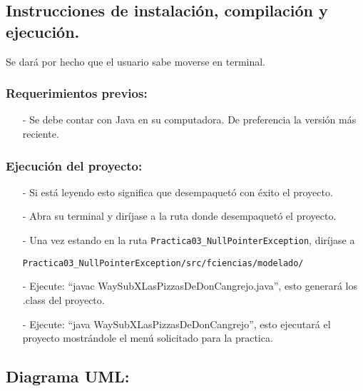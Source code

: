 \documentclass{article}
\newcommand{\code}[1]{\textcolor{white!25!black}{\texttt{#1}}}
\begin{document}
\subsection*{Instrucciones de instalación, compilación y ejecución.}
Se dará por hecho que el usuario sabe moverse en terminal.\\

\subsubsection*{Requerimientos previos:}
\begin{itemize}
\item[-] Se debe contar con Java en su computadora. De preferencia la versión más reciente.
\end{itemize}

\subsubsection*{Ejecución del proyecto:}
\begin{itemize}
\item[-] Si está leyendo esto significa que desempaquetó con éxito el proyecto.
\item[-] Abra su terminal y diríjase a la ruta donde desempaquetó el proyecto.
\item[-] Una vez estando en la ruta \code{Practica03\_NullPointerException}, diríjase a

  \code{Practica03\_NullPointerException/src/fciencias/modelado/}
\item[-] Ejecute: “javac WaySubXLasPizzasDeDonCangrejo.java”, esto generará los .class del proyecto.
\item[-] Ejecute: “java WaySubXLasPizzasDeDonCangrejo”, esto ejecutará el proyecto mostrándole el menú solicitado para la practica.
\end{itemize}

\newpage
\subsection*{Diagrama UML:}
\end{document}
